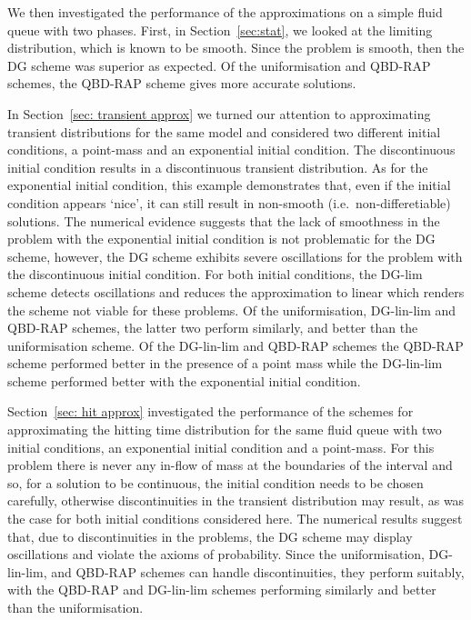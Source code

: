We then investigated the performance of the approximations on a simple fluid queue with two phases. First, in Section~\ref{sec:stat}, we looked at the limiting distribution, which is known to be smooth. Since the problem is smooth, then the DG scheme was superior as expected. Of the uniformisation and QBD-RAP schemes, the QBD-RAP scheme gives more accurate solutions. 

In Section~\ref{sec: transient approx} we turned our attention to approximating transient distributions for the same model and considered two different initial conditions, a point-mass and an exponential initial condition. The discontinuous initial condition results in a discontinuous transient distribution. As for the exponential initial condition, this example demonstrates that, even if the initial condition appears `nice', it can still result in non-smooth (i.e.~non-differetiable) solutions. The numerical evidence suggests that the lack of smoothness in the problem with the exponential initial condition is not problematic for the DG scheme, however, the DG scheme exhibits severe oscillations for the problem with the discontinuous initial condition. For both initial conditions, the DG-lim scheme detects oscillations and reduces the approximation to linear which renders the scheme not viable for these problems. Of the uniformisation, DG-lin-lim and QBD-RAP schemes, the latter two perform similarly, and better than the uniformisation scheme. Of the DG-lin-lim and QBD-RAP schemes the QBD-RAP scheme performed better in the presence of a point mass while the DG-lin-lim scheme performed better with the exponential initial condition.

Section~\ref{sec: hit approx} investigated the performance of the schemes for approximating the hitting time distribution for the same fluid queue with two initial conditions, an exponential initial condition and a point-mass. For this problem there is never any in-flow of mass at the boundaries of the interval and so, for a solution to be continuous, the initial condition needs to be chosen carefully, otherwise discontinuities in the transient distribution may result, as was the case for both initial conditions considered here. The numerical results suggest that, due to discontinuities in the problems, the DG scheme may display oscillations and violate the axioms of probability. Since the uniformisation, DG-lin-lim, and QBD-RAP schemes can handle discontinuities, they perform suitably, with the QBD-RAP and DG-lin-lim schemes performing similarly and better than the uniformisation. 

